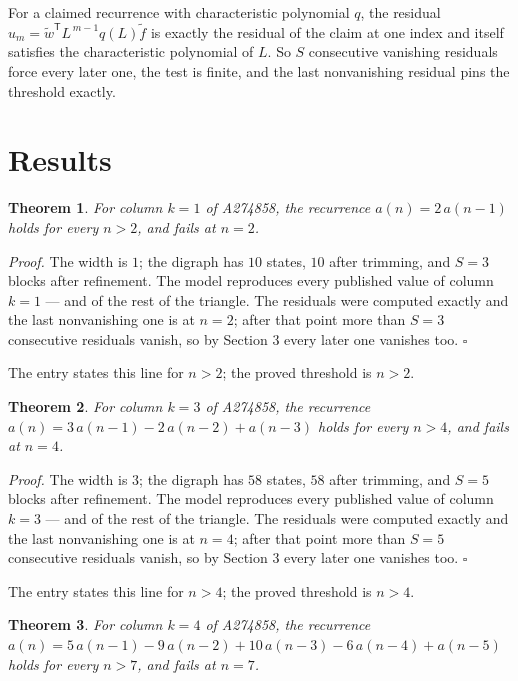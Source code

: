 \documentclass[11pt]{article}
\newtheorem{theorem}{Theorem}
\theoremstyle{definition}
\begin{document}
For a claimed recurrence with characteristic polynomial $q$, the residual $u_m = \tilde w^{\mathsf T}L^{\,m-1}q(L)\tilde f$ is exactly the residual of the claim at one index and itself satisfies the characteristic polynomial of $L$. So $S$ consecutive vanishing residuals force every later one, the test is finite, and the last nonvanishing residual pins the threshold exactly.

\section{Results}

\begin{theorem} For column $k = 1$ of A274858, the recurrence $a(n) = 2\,a(n-1)$ holds for every $n > 2$, and fails at $n = 2$.\end{theorem}

{\itshape Proof.} The width is $1$; the digraph has $10$ states, $10$ after trimming, and $S = 3$ blocks after refinement. The model reproduces every published value of column $k = 1$ --- and of the rest of the triangle. The residuals were computed exactly and the last nonvanishing one is at $n = 2$; after that point more than $S = 3$ consecutive residuals vanish, so by Section 3 every later one vanishes too. $\square$

The entry states this line for $n > 2$; the proved threshold is $n > 2$.

\begin{theorem} For column $k = 3$ of A274858, the recurrence $a(n) = 3\,a(n-1) - 2\,a(n-2) + a(n-3)$ holds for every $n > 4$, and fails at $n = 4$.\end{theorem}

{\itshape Proof.} The width is $3$; the digraph has $58$ states, $58$ after trimming, and $S = 5$ blocks after refinement. The model reproduces every published value of column $k = 3$ --- and of the rest of the triangle. The residuals were computed exactly and the last nonvanishing one is at $n = 4$; after that point more than $S = 5$ consecutive residuals vanish, so by Section 3 every later one vanishes too. $\square$

The entry states this line for $n > 4$; the proved threshold is $n > 4$.

\begin{theorem} For column $k = 4$ of A274858, the recurrence $a(n) = 5\,a(n-1) - 9\,a(n-2) + 10\,a(n-3) - 6\,a(n-4) + a(n-5)$ holds for every $n > 7$, and fails at $n = 7$.\end{theorem}
\end{document}
